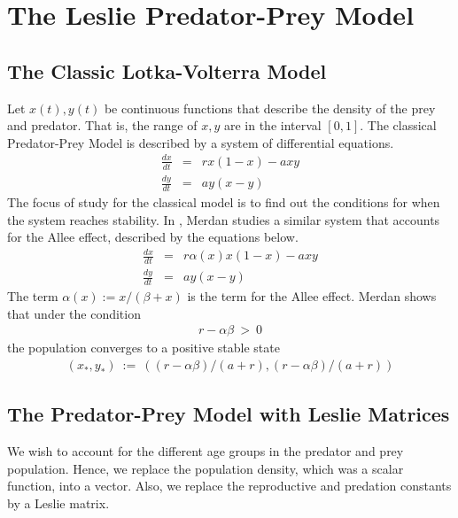 \documentclass[11pt,reqno]{amsart}
\numberwithin{equation}{section}
\theoremstyle{plain}
\begin{document}
% 

\section{The Leslie Predator-Prey Model}

\subsection{The Classic 
Lotka-Volterra Model}
Let $x(t), y(t)$ be continuous functions 
that describe the density of the prey and predator. That is, the range of $x, y$ are in the interval $[0, 1]$. The classical Predator-Prey Model is described by a system of differential equations. 
\begin{eqnarray}
    \frac{dx}{dt} &=& 
    rx(1-x) - axy \nonumber\\ 
    \frac {dy}{dt} &=& 
    ay(x-y)
\end{eqnarray}
The focus of study for the classical model is to find out the conditions 
for when the system reaches stability. In \cite{Mer10}, Merdan studies a 
similar system that accounts for the Allee effect, described by the equations below. 
\begin{eqnarray}
    \frac {dx}{dt} & = & r\alpha(x) x (1-x) - axy \nonumber \\ 
    \frac {dy}{dt} & = & ay(x - y)
\end{eqnarray}
The term $\alpha(x) := x/(\beta + x)$ is the term for the Allee effect. Merdan shows that under the condition 
\begin{eqnarray}
    r - \alpha \beta  \ > \ 0 
\end{eqnarray}
the population converges to a 
positive stable state 
\begin{eqnarray}
    (x_*, y_*) \ := \ ((r - \alpha\beta)/(a + r), (r-\alpha\beta)/(a + r)) 
\end{eqnarray}

\subsection{The Predator-Prey Model with Leslie Matrices}\label{sec:PPmodels}

We wish to account for the different age groups in the predator and prey population. Hence, we replace the population density, which was a scalar function, into a vector. Also, we replace the reproductive and predation constants by a Leslie matrix. 
\end{document}
